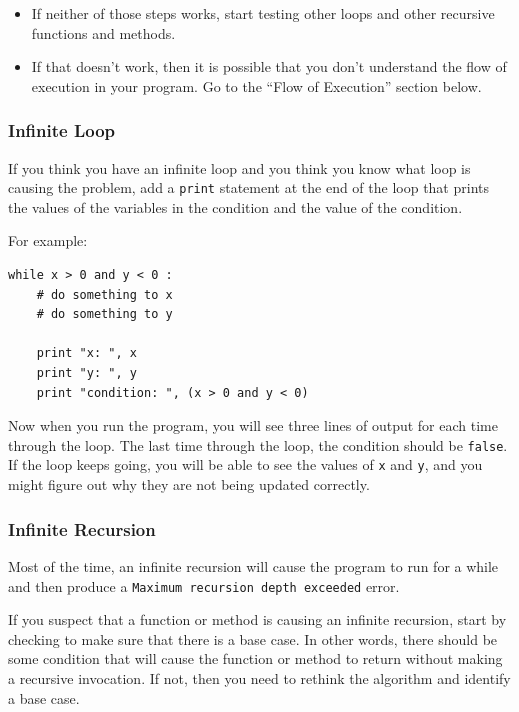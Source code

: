 \documentclass[10pt]{book}
\begin{document}
\begin{CJK}{UTF8}{gbsn}
\begin{itemize}
\item If neither of those steps works, start testing other
loops and other recursive functions and methods.

\item If that doesn't work, then it is possible that
you don't understand the flow of execution in your program.
Go to the ``Flow of Execution'' section below.

\end{itemize}


\subsubsection{Infinite Loop}

If you think you have an infinite loop and you think you know
what loop is causing the problem, add a {\tt print} statement at
the end of the loop that prints the values of the variables in
the condition and the value of the condition.

For example:

\begin{verbatim}
while x > 0 and y < 0 :
    # do something to x
    # do something to y

    print "x: ", x
    print "y: ", y
    print "condition: ", (x > 0 and y < 0)
\end{verbatim}
%
Now when you run the program, you will see three lines of output
for each time through the loop.  The last time through the
loop, the condition should be {\tt false}.  If the loop keeps
going, you will be able to see the values of {\tt x} and {\tt y},
and you might figure out why they are not being updated correctly.


\subsubsection{Infinite Recursion}

Most of the time, an infinite recursion will cause the program to run
for a while and then produce a {\tt Maximum recursion depth exceeded}
error.

If you suspect that a function or method is causing an infinite
recursion, start by checking to make sure that there is a base case.
In other words, there should be some condition that will cause the
function or method to return without making a recursive invocation.
If not, then you need to rethink the algorithm and identify a base
case.


\end{CJK}
\end{document}

